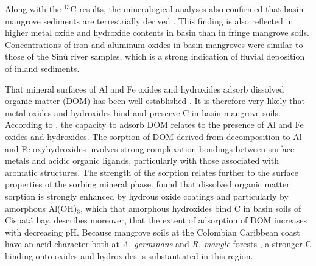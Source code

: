 Along with the $^{13}$C results, the mineralogical analyses also confirmed that basin mangrove sediments are terrestrially derived \DIFaddbegin {}\DIFaddend . This finding is also reflected in higher metal oxide and hydroxide contents in basin than in fringe mangrove soils. Concentrations of iron and aluminum oxides in basin mangroves were similar to those of the Sin\'{u} river samples, which is a strong indication of fluvial deposition of inland sediments. 


That mineral surfaces of Al and Fe oxides and hydroxides adsorb dissolved organic matter (DOM) has been well established \citep{tipping1981, Oades1988, kaiser2000, Mikutta2006}. It is therefore very likely that metal oxides and hydroxides bind and preserve C in basin mangrove soils. According to \citet{kaiser2000}, the capacity to adsorb DOM relates to the presence of Al and Fe oxides and hydroxides. The sorption of DOM derived from decomposition to Al and Fe oxyhydroxides involves strong complexation bondings between surface metals and acidic organic ligands, particularly with those associated with aromatic structures. The strength of the sorption relates further to the surface properties of the sorbing mineral phase. \citet{kaiser2000} found that dissolved organic matter sorption is strongly enhanced by hydrous oxide coatings and particularly by amorphous Al(OH)$_3$, which \DIFdelbegin {}\DIFdelend \DIFaddbegin {}\DIFaddend that amorphous hydroxides bind C in basin soils of Cispat\'{a} bay. \citet{tipping1981} describes moreover, that the extent of adsorption of DOM increases with decreasing pH. Because mangrove soils at the Colombian Caribbean coast have an acid character both at \textit {A. germinans} and \textit {R. mangle} forests \citep{urrego2014}, a stronger C binding onto oxides and hydroxides is substantiated in this region. 

